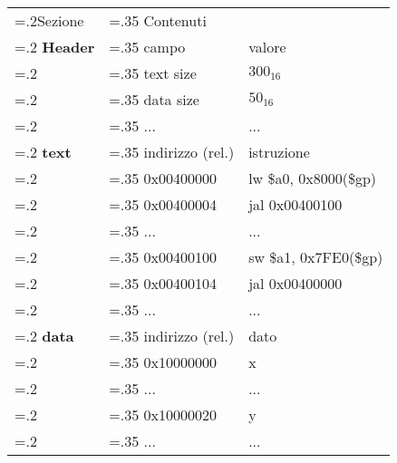 \documentclass[varwidth=6in]{standalone}
\providecommand\lightrule{%
	\arrayrulecolor{black!30}%
	\midrule[\lightrulewidth]%
	\arrayrulecolor{black}}
\begin{document}
	\begin{tabularx}{\textwidth}{ >{\hsize=.2\textwidth}X >{\hsize=.35\textwidth}X  X
		}
		\toprule
			Sezione & Contenuti & \\\lightrule
			\textbf{Header} & campo & valore \\\lightrule
			& text size & $300_{16}$ \\
			& data size & $50_{16}$ \\
			& ... & ... \\\lightrule
			\textbf{text} & indirizzo (rel.) & istruzione \\\lightrule
			& 0x00400000 & lw \$a0, 0x8000(\$gp) \\
			& 0x00400004 & jal 0x00400100 \\
			& ... & ... \\
			& 0x00400100 & sw \$a1, 0x7FE0(\$gp) \\
			& 0x00400104 & jal 0x00400000 \\
			& ... & ... \\\lightrule
			\textbf{data} & indirizzo (rel.) & dato \\
			& 0x10000000 & x \\
			& ... & ... \\
			& 0x10000020 & y \\
			& ... & ... \\
		\bottomrule
	\end{tabularx}
\end{document}
